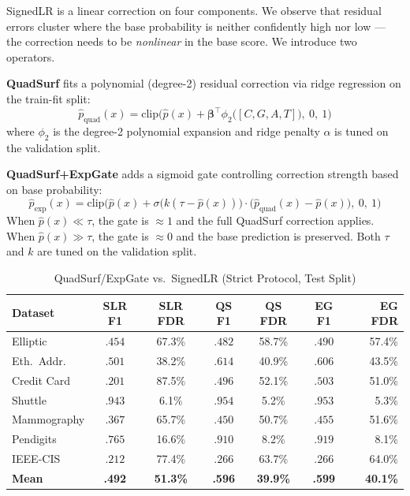 \documentclass[journal]{IEEEtran}
\begin{document}
SignedLR is a linear correction on four components. We observe that residual errors cluster where the base probability is neither confidently high nor low --- the correction needs to be \textit{nonlinear} in the base score. We introduce two operators.

\textbf{QuadSurf} fits a polynomial (degree-2) residual correction via ridge regression on the train-fit split:
\begin{equation}
  \hat{p}_{\text{quad}}(x) = \text{clip}\!\Big(\hat{p}(x) + \bm{\beta}^\top \phi_2\!\big([C, G, A, T]\big),\ 0,\ 1\Big)
  \label{eq:quadsurf_def}
\end{equation}
where $\phi_2$ is the degree-2 polynomial expansion and ridge penalty $\alpha$ is tuned on the validation split.

\textbf{QuadSurf+ExpGate} adds a sigmoid gate controlling correction strength based on base probability:
\begin{equation}
  \hat{p}_{\text{exp}}(x) = \text{clip}\!\Big(\hat{p}(x) + \sigma\!\big(k(\tau\!-\!\hat{p}(x))\big) \cdot \big(\hat{p}_{\text{quad}}(x) - \hat{p}(x)\big),\ 0,\ 1\Big)
  \label{eq:expgate_def}
\end{equation}
When $\hat{p}(x) \ll \tau$, the gate is $\approx 1$ and the full QuadSurf correction applies. When $\hat{p}(x) \gg \tau$, the gate is $\approx 0$ and the base prediction is preserved. Both $\tau$ and $k$ are tuned on the validation split.

\begin{table}[!t]
\centering
\caption{QuadSurf/ExpGate vs.\ SignedLR (Strict Protocol, Test Split)}
\label{tab:quadsurf}
\setlength{\tabcolsep}{3pt}
\begin{tabular}{@{}lcccccr@{}}
\toprule
\textbf{Dataset} & \textbf{SLR F1} & \textbf{SLR FDR} & \textbf{QS F1} & \textbf{QS FDR} & \textbf{EG F1} & \textbf{EG FDR} \\
\midrule
Elliptic    & $.454$ & 67.3\% & $.482$ & 58.7\% & $.490$ & 57.4\% \\
Eth.\ Addr. & $.501$ & 38.2\% & $.614$ & 40.9\% & $.606$ & 43.5\% \\
Credit Card & $.201$ & 87.5\% & $.496$ & 52.1\% & $.503$ & 51.0\% \\
Shuttle     & $.943$ & 6.1\%  & $.954$ & 5.2\%  & $.953$ & 5.3\% \\
Mammography & $.367$ & 65.7\% & $.450$ & 50.7\% & $.455$ & 51.6\% \\
Pendigits   & $.765$ & 16.6\% & $.910$ & 8.2\%  & $.919$ & 8.1\% \\
IEEE-CIS    & $.212$ & 77.4\% & $.266$ & 63.7\% & $.266$ & 64.0\% \\
\midrule
\textbf{Mean} & \textbf{.492} & \textbf{51.3\%} & \textbf{.596} & \textbf{39.9\%} & \textbf{.599} & \textbf{40.1\%} \\
\bottomrule
\end{tabular}
\end{table}
\end{document}
